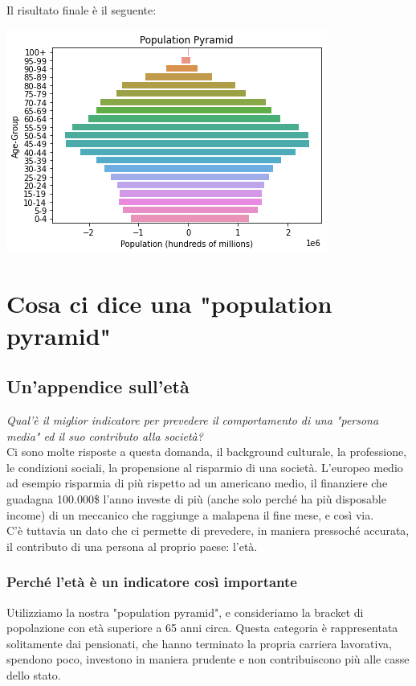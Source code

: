 \documentclass[11pt, oneside]{article}   	%
\begin{document}
Il risultato finale è il seguente:
\begin{center}
\includegraphics[scale=1]{popitaly5}
\end{center}


\section{Cosa ci dice una "population pyramid"}
\subsection{Un'appendice sull'età}
\emph{Qual'è il miglior indicatore per prevedere il comportamento di una "persona media" ed il suo contributo alla società?}\\
Ci sono molte risposte a questa domanda, il background culturale, la professione, le condizioni sociali, la propensione al risparmio di una società. L'europeo medio ad esempio risparmia di più rispetto ad un americano medio, il finanziere che guadagna 100.000\$ l'anno investe di più (anche solo perché ha più disposable income) di un meccanico che raggiunge a malapena il fine mese, e così via.\\
C'è tuttavia un dato che ci permette di prevedere, in maniera pressoché accurata, il contributo di una persona al proprio paese: l'età.

\subsubsection{Perché l'età è un indicatore così importante}
Utilizziamo la nostra "population pyramid", e consideriamo la bracket di popolazione con età superiore a 65 anni circa. Questa categoria è rappresentata solitamente dai pensionati, che hanno terminato la propria carriera lavorativa, spendono poco, investono in maniera prudente e non contribuiscono più alle casse dello stato. \\
\end{document}
